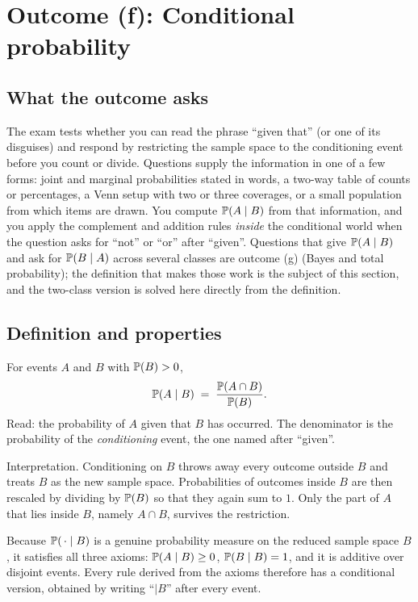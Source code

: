 \section{Outcome (f): Conditional probability}

\subsection{What the outcome asks}

The exam tests whether you can read the phrase ``given that'' (or one of its
disguises) and respond by restricting the sample space to the conditioning event
before you count or divide. Questions supply the information in one of a few
forms: joint and marginal probabilities stated in words, a two-way table of
counts or percentages, a Venn setup with two or three coverages, or a small
population from which items are drawn. You compute $\mathbb{P}(A \mid B)$ from that
information, and you apply the complement and addition rules \emph{inside} the
conditional world when the question asks for ``not'' or ``or'' after ``given''.
Questions that give $\mathbb{P}(A\mid B)$ and ask for $\mathbb{P}(B\mid A)$ across several
classes are outcome (g) (Bayes and total probability); the definition that makes
those work is the subject of this section, and the two-class version is solved
here directly from the definition.

\subsection{Definition and properties}

\begin{keyfact}
For events $A$ and $B$ with $\mathbb{P}(B) > 0$,
\[
\mathbb{P}(A \mid B) \;=\; \frac{\mathbb{P}(A \cap B)}{\mathbb{P}(B)} .
\]
Read: the probability of $A$ given that $B$ has occurred. The denominator is the
probability of the \emph{conditioning} event, the one named after ``given''.
\end{keyfact}

Interpretation. Conditioning on $B$ throws away every outcome outside $B$ and
treats $B$ as the new sample space. Probabilities of outcomes inside $B$ are then
rescaled by dividing by $\mathbb{P}(B)$ so that they again sum to $1$. Only the part
of $A$ that lies inside $B$, namely $A \cap B$, survives the restriction.

Because $\mathbb{P}(\,\cdot \mid B)$ is a genuine probability measure on the reduced
sample space $B$, it satisfies all three axioms: $\mathbb{P}(A\mid B) \ge 0$,
$\mathbb{P}(B \mid B) = 1$, and it is additive over disjoint events. Every rule
derived from the axioms therefore has a conditional version, obtained by
writing ``$\mid B$'' after every event.

